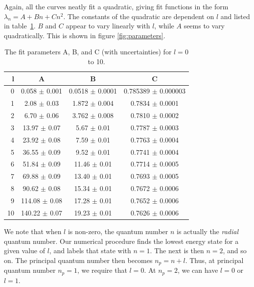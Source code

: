 \documentclass[12pt,twoside]{reedthesis}
\begin{document}
Again, all the curves neatly fit a quadratic, giving fit functions in the form $\lambda_n = A + B n + C n^2$. The constants of the quadratic are dependent on $l$ and listed in table~\ref{tab:fitparams}. $B$ and $C$ appear to vary linearly with $l$, while $A$ seems to vary quadratically. This is shown in figure \ref{fig:parameters}.
\begin{table}[h]
	\centering
	\caption{The fit parameters A, B, and C (with uncertainties) for $l = 0$ to 10.}
	\label{tab:fitparams}
	\begin{tabular}{r|ccc}
		l	& A	 	& B	 	& C	 \\
		\hline
		0	& 0.058	$\pm$ 0.001	& 0.0518	$\pm$ 0.0001	& 0.785389	$\pm$ 0.000003\\
		1	& 2.08	$\pm$ 0.03	& 1.872	$\pm$ 0.004	& 0.7834	$\pm$ 0.0001\\
		2	& 6.70	$\pm$ 0.06	& 3.762	$\pm$ 0.008	& 0.7810	$\pm$ 0.0002\\
		3	& 13.97	$\pm$ 0.07	& 5.67	$\pm$ 0.01	& 0.7787	$\pm$ 0.0003\\
		4	& 23.92	$\pm$ 0.08	& 7.59	$\pm$ 0.01	& 0.7763	$\pm$ 0.0004\\
		5	& 36.55	$\pm$ 0.09	& 9.52	$\pm$ 0.01	& 0.7741	$\pm$ 0.0004\\
		6	& 51.84	$\pm$ 0.09	& 11.46	$\pm$ 0.01	& 0.7714	$\pm$ 0.0005\\
		7	& 69.88	$\pm$ 0.09	& 13.40	$\pm$ 0.01	& 0.7693	$\pm$ 0.0005\\
		8	& 90.62	$\pm$ 0.08	& 15.34	$\pm$ 0.01	& 0.7672	$\pm$ 0.0006\\
		9	& 114.08	$\pm$ 0.08	& 17.28	$\pm$ 0.01	& 0.7652	$\pm$ 0.0006\\
		10	& 140.22	$\pm$ 0.07	& 19.23	$\pm$ 0.01	& 0.7626	$\pm$ 0.0006
	\end{tabular}
\end{table}

We note that when $l$ is non-zero, the quantum number $n$ is actually the \emph{radial} quantum number. Our numerical procedure finds the lowest energy state for a given value of $l$, and labels that state with $n = 1$. The next is then $n = 2$, and so on. The principal quantum number then becomes $n_p = n + l$. Thus, at principal quantum number $n_p = 1$, we require that $l = 0$. At $n_p = 2$, we can have $l = 0$ or $l = 1$. 
\end{document}
